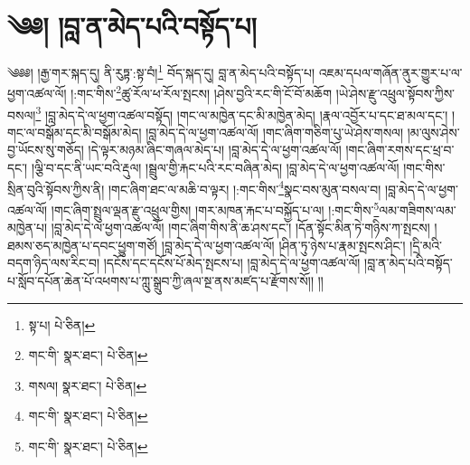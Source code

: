 \setcounter{footnote}{0} 
\chapter{༄༅། །བླ་ན་མེད་པའི་བསྟོད་པ།}༄༅༅། །རྒྱ་གར་སྐད་དུ། ནི་རུཏྟ་:སྟ་བཾ།\footnote{སྟ་པ།  པེ་ཅིན། } བོད་སྐད་དུ། བླ་ན་མེད་པའི་བསྟོད་པ། འཇམ་དཔལ་གཞོན་ནུར་གྱུར་པ་ལ་ཕྱག་འཚལ་ལོ། །:གང་གིས་\footnote{གང་གི་  སྣར་ཐང་།  པེ་ཅིན། }ཚུ་རོལ་ཕ་རོལ་སྤངས། །ཤེས་བྱའི་རང་གི་ངོ་བོ་མཆོག །ཡེ་ཤེས་རྫུ་འཕྲུལ་སྟོབས་ཀྱིས་བསལ།\footnote{གསལ།  སྣར་ཐང་།  པེ་ཅིན། } །བླ་མེད་དེ་ལ་ཕྱག་འཚལ་བསྟོད། །གང་ལ་མཁྱེན་དང་མི་མཁྱེན་མེད། །རྣལ་འབྱོར་པ་དང་ཐ་མལ་དང་། །གང་ལ་བསྒོམ་དང་མི་བསྒོམ་མེད། །བླ་མེད་དེ་ལ་ཕྱག་འཚལ་ལོ། །གང་ཞིག་གཅིག་པུ་ཡེ་ཤེས་གསལ། །མ་ལུས་ཤེས་བྱ་ཡོངས་སུ་གཅོད། །དེ་ལྟར་མཉམ་ཞིང་གཞལ་མེད་པ། །བླ་མེད་དེ་ལ་ཕྱག་འཚལ་ལོ། །གང་ཞིག་རགས་དང་ཕྲ་བ་དང་། །ལྕི་བ་དང་ནི་ཡང་བའི་རྡུལ། །སྦྲུལ་གྱི་རྐང་པའི་རང་བཞིན་མེད། །བླ་མེད་དེ་ལ་ཕྱག་འཚལ་ལོ། །གང་གིས་སྲིན་བུའི་སྟོབས་ཀྱིས་ནི། །གང་ཞིག་ཐང་ལ་མཆི་བ་ལྟར། །:གང་གིས་\footnote{གང་གི་  སྣར་ཐང་།  པེ་ཅིན། }སྣང་བས་མུན་བསལ་བ། །བླ་མེད་དེ་ལ་ཕྱག་འཚལ་ལོ། །གང་ཞིག་སྤྲུལ་ལྡན་རྫུ་འཕྲུལ་གྱིས། །གར་མཁན་རྐང་པ་བསྐྱོད་པ་ལ། །:གང་གིས་\footnote{གང་གི་  སྣར་ཐང་།  པེ་ཅིན། }ལམ་གཟིགས་ལམ་མཁྱེན་པ། །བླ་མེད་དེ་ལ་ཕྱག་འཚལ་ལོ། །གང་ཞིག་གིས་ནི་ཆ་ཤས་དང་། །དོན་སྟོང་མིན་ཏེ་གཉིས་ཀ་སྤངས། །ཐམས་ཅད་མཁྱེན་པ་དབང་ཕྱུག་གཙོ། །བླ་མེད་དེ་ལ་ཕྱག་འཚལ་ལོ། །ཤིན་ཏུ་ཉེས་པ་རྣམ་སྤངས་ཤིང་། །དྲི་མའི་བདག་ཉིད་ལས་རིང་བ། །དངོས་དང་དངོས་པོ་མེད་སྤངས་པ། །བླ་མེད་དེ་ལ་ཕྱག་འཚལ་ལོ། །བླ་ན་མེད་པའི་བསྟོད་པ་སློབ་དཔོན་ཆེན་པོ་འཕགས་པ་ཀླུ་སྒྲུབ་ཀྱི་ཞལ་སྔ་ནས་མཛད་པ་རྫོགས་སོ།། །།